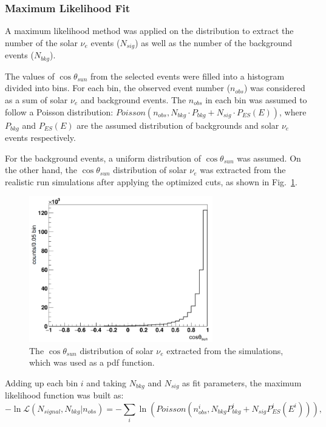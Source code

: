 \subsubsection{Maximum Likelihood Fit}\label{poisson_fit}
A maximum likelihood method was applied on the distribution to extract the number of the solar $\nu_e$ events ($N_{sig}$) as well as the number of the background events ($N_{bkg}$).

The values of $\cos\theta_{sun}$ from the selected events were filled into a histogram divided into bins.
For each bin, the observed event number ($n_{obs}$) was considered as a sum of solar $\nu_e$ and background events. The $n_{obs}$ in each bin was assumed to follow a Poisson distribution: $Poisson(n_{obs}, N_{bkg}\cdot P_{bkg}+N_{sig}\cdot P_{ES}(E))$, where $P_{bkg}$ and $P_{ES}(E)$ are the assumed distribution of backgrounds and solar $\nu_e$ events respectively.

For the background events, a uniform distribution of $\cos\theta_{sun}$ was assumed. On the other hand, the $\cos\theta_{sun}$ distribution of solar $\nu_e$ was extracted from the realistic run simulations after applying the optimized cuts, as shown in Fig.~\ref{solarPDF}. 

\begin{figure}[!htb]
	\centering
	\includegraphics[width=8cm]{solarPDF.png}
	\caption{The $\cos\theta_{sun}$ distribution of solar $\nu_e$ extracted from the simulations, which was used as a pdf function.}
	\label{solarPDF}
\end{figure}

Adding up each bin $i$ and taking $N_{bkg}$ and $N_{sig}$ as fit parameters, the maximum likelihood function was built as:
\begin{equation}\label{eq:solar_poissonFit}
-\ln\mathcal L(N_{signal},N_{bkg}|n_{obs})
=-\sum_i\ln(Poisson(n^i_{obs}, N_{bkg}P^i_{bkg}+N_{sig}P^i_{ES}(E^i))),
\end{equation}

